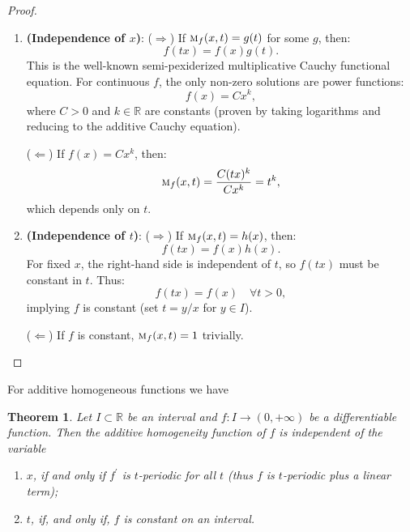 \documentclass{amsart}
\newtheorem{theorem}{Theorem}
\theoremstyle{plain}
\numberwithin{equation}{section}
\newcommand{\mh}{\textsc{m}}
\newcommand{\R}{{\mathbb{R}}}
\begin{document}
\begin{proof}
\begin{enumerate}
    \item \textbf{(Independence of \( x \))}:
    (\(\Rightarrow\)) If \( \mh_f(x,t) = g(t) \) for some \( g \), then:
    \[
    f(tx) = f(x) g(t).
    \]
    This is the well-known semi-pexiderized multiplicative Cauchy functional equation. For continuous \( f \), the only non-zero solutions are power functions:
    \[
    f(x) = Cx^k,
    \]
    where \( C > 0 \) and \( k \in \mathbb{R} \) are constants (proven by taking logarithms and reducing to the additive Cauchy equation).
    
    (\(\Leftarrow\)) If \( f(x) = Cx^k \), then:
    \[
    \mh_f(x,t) = \frac{C(tx)^k}{Cx^k} = t^k,
    \]
    which depends only on \( t \).

    \item \textbf{(Independence of \( t \))}:
    (\(\Rightarrow\)) If \( \mh_f(x,t) = h(x) \), then:
    \[
    f(tx) = f(x) h(x).
    \]
    For fixed \( x \), the right-hand side is independent of \( t \), so \( f(tx) \) must be constant in \( t \). Thus:
    \[
    f(tx) = f(x) \quad \forall t > 0,
    \]
    implying \( f \) is constant (set \( t = y/x \) for \( y \in I \)).
    
    (\(\Leftarrow\)) If \( f \) is constant, \( \mh_f(x,t) = 1 \) trivially.
\end{enumerate}
\end{proof}



For additive homogeneous functions we have
\begin{theorem}
Let $I \subset \R$ be an interval and $f:I \to (0, +\infty)$ be a differentiable function.
Then the additive homogeneity function of $f$ is independent of the variable
\begin{enumerate}
	\item 
	$x$, if and only if
	$f^\prime$ is $t$-periodic
    for all $t$ 
    (thus $f$ is  $t$-periodic plus a linear term); 
	\item 
	$t$, if, and only if, $f$ is constant on an interval.
\end{enumerate}
\end{theorem}
\end{document}
